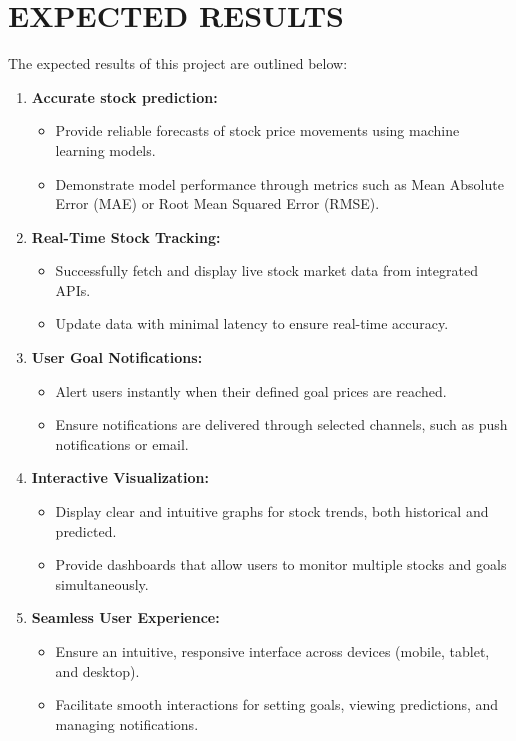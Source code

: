 \chapter{EXPECTED RESULTS}
The expected results of this project are outlined below:

    
\begin{enumerate}

\item \textbf {Accurate stock prediction:}
\begin{itemize}
\item Provide reliable forecasts of stock price movements using machine learning models.
\item Demonstrate model performance through metrics such as Mean Absolute Error (MAE) or Root Mean Squared Error (RMSE).
\end{itemize}

\item  \textbf {Real-Time Stock Tracking:}
\begin{itemize}
\item Successfully fetch and display live stock market data from integrated APIs.
\item Update data with minimal latency to ensure real-time accuracy.

\end{itemize}

\item \textbf {User Goal Notifications:}
\begin{itemize}
 \item Alert users instantly when their defined goal prices are reached.

\item Ensure notifications are delivered through selected channels, such as push notifications or email.
\end{itemize}


\item  \textbf  {Interactive Visualization:}
\begin{itemize}
\item Display clear and intuitive graphs for stock trends, both historical and predicted.

\item Provide dashboards that allow users to monitor multiple stocks and goals simultaneously.

\end{itemize}

\item \textbf {Seamless User Experience:}
\begin{itemize}
\item Ensure an intuitive, responsive interface across devices (mobile, tablet, and desktop).

\item Facilitate smooth interactions for setting goals, viewing predictions, and managing notifications.

\end{itemize}

\end{enumerate}
